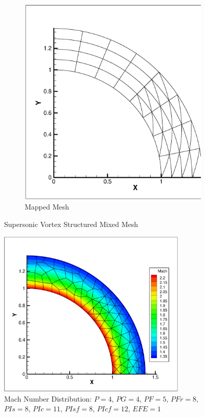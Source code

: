 \documentclass[12pt,Bold,letterpaper,TexShade]{mcgilletdclass}
\numberwithin{equation}{section}
\begin{document}
\begin{figure}
\begin{subfigure}[b]{0.45\textwidth}
        \includegraphics[width=\textwidth]{./figures/StructuredMixedML1P4_Curved.eps}
        \caption{Mapped Mesh}
    \end{subfigure}
    \caption{Supersonic Vortex Structured Mixed Mesh}
    \label{fig:SupersonicVortexStructuredML1P4}
\end{figure}


\begin{figure}[ht!] 
\centering
\includegraphics[width=0.8\textwidth]{./figures/SupersonicVortexMachDist_ML1P4.eps}
\caption{Mach Number Distribution: $P=4$, $PG=4$, $PF=5$, $PFr=8$, $PIs =8$, $PIc =11$, $PIsf =8$, $PIcf =12$, $EFE = 1$}
\label{fig:MachDistP4PG4PF5PFr8PIs8PIc11PIsf8PIcf12EFE1}
\end{figure}
\end{document}
